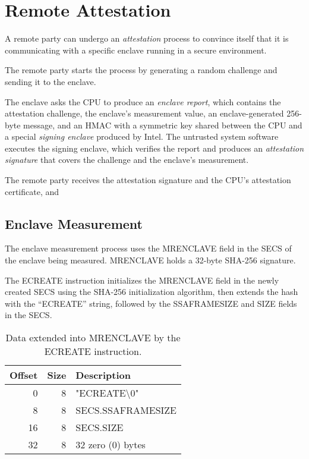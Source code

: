 \section{Remote Attestation}
\label{sec:attestation}

A remote party can undergo an \textit{attestation} process to convince itself
that it is communicating with a specific enclave running in a secure
environment.


The remote party starts the process by generating a random
challenge and sending it to the enclave.

The enclave asks the CPU to produce an \textit{enclave report}, which contains
the attestation challenge, the enclave's measurement value, an
enclave-generated 256-byte message, and an HMAC
 with a symmetric key shared between the CPU and a special
\textit{signing enclave} produced by Intel. The untrusted system software
executes the signing enclave, which verifies the report and produces an
\textit{attestation signature} that covers the challenge and the enclave's
measurement.

The remote party receives the attestation signature and the CPU's attestation
certificate, and

\subsection{Enclave Measurement}
\label{sec:measurement}


The enclave measurement process uses the MRENCLAVE field in the SECS of the
enclave being measured. MRENCLAVE holds a 32-byte SHA-256 signature.


The ECREATE instruction initializes the MRENCLAVE field in the newly created
SECS using the SHA-256 initialization algorithm, then extends the hash with
the ``ECREATE'' string, followed by the SSAFRAMESIZE and SIZE fields in the
SECS.

\begin{table}[hbt]
  \centering
  \begin{tabularx}{\columnwidth}{| r | r | X |}
  \hline
  \textbf{Offset} & \textbf{Size} & \textbf{Description}\\
  \hline
  0 & 8 & "ECREATE\textbackslash{}0" \\
  \hline
  8 & 8 & SECS.SSAFRAMESIZE \\
  \hline
  16 & 8 & SECS.SIZE \\
  \hline
  32 & 8 & 32 zero (0) bytes \\
  \hline
  \end{tabularx}
  \caption{
    Data extended into MRENCLAVE by the ECREATE instruction.
  }
  \label{fig:ecreate_mrenclave}
\end{table}

